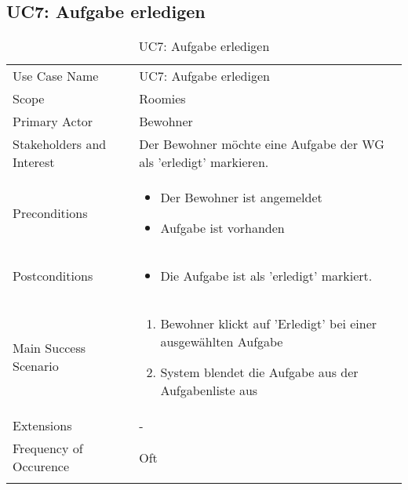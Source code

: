 \subsection{UC7: Aufgabe erledigen}
\begin{table}[H]
	\tablestyle
	\tablealtcolored
	\begin{tabularx}{\textwidth}{lX}
		\tablebody
			Use Case Name &
			UC7: Aufgabe erledigen
			\tabularnewline
			Scope &
			Roomies
			\tabularnewline
			Primary Actor &
			Bewohner
			\tabularnewline
			Stakeholders and Interest &
			Der Bewohner möchte eine Aufgabe der WG als 'erledigt' markieren.
			\tabularnewline
			Preconditions &
			\begin{itemize}
				\item Der Bewohner ist angemeldet
				\item Aufgabe ist vorhanden
			\end{itemize}
			\tabularnewline
			Postconditions &
			\begin{itemize}
				\item Die Aufgabe ist als 'erledigt' markiert.
			\end{itemize}
			\tabularnewline
			Main Success Scenario &
			\begin{enumerate}
				\item Bewohner klickt auf 'Erledigt' bei einer ausgewählten Aufgabe
				\item System blendet die Aufgabe aus der Aufgabenliste aus
			\end{enumerate}
			\tabularnewline
			Extensions &
			-
			\tabularnewline
			Frequency of Occurence &
			Oft
			\tabularnewline
		\tableend
	\end{tabularx}
	\caption{UC7: Aufgabe erledigen}
\end{table}